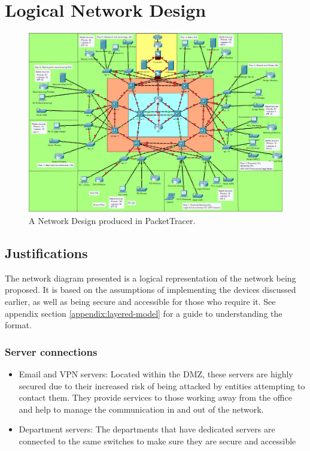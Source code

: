 \chapter{Logical Network Design}

\begin{figure}[ht]
    \includegraphics[width=15cm]{Figures/Network_Diagram.png}
    \caption{A Network Design produced in PacketTracer.}
    \label{fig:Network_Diagram}
\end{figure}



\section{Justifications}

The network diagram presented is a logical representation of the network being proposed. It is based on the assumptions of implementing the devices discussed earlier, as well as being secure and accessible for those who require it. See appendix section \ref{appendix:layered-model} for a guide to understanding the format.

\subsection{Server connections}
\begin{itemize}
    \item Email and VPN servers: Located within the DMZ, these servers are highly secured due to their increased risk of being attacked by entities attempting to contact them. They provide services to those working away from the office and help to manage the communication in and out of the network.
    \item Department servers: The departments that have dedicated servers are connected to the same switches to make sure they are secure and accessible
\end{itemize}
